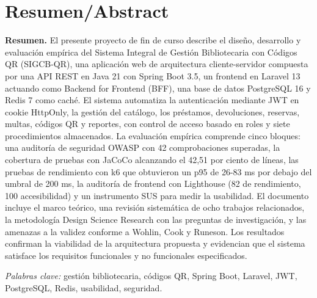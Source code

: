 \documentclass[
11pt,
a4paper,
]{report}
\begin{document}
	\hypertarget{abstract}{%
		\chapter*{Resumen/Abstract}\label{abstract}}
	
	\textbf{Resumen.} El presente proyecto de fin de curso describe el diseño, desarrollo y evaluación empírica del Sistema Integral de Gestión Bibliotecaria con Códigos QR (SIGCB-QR), una aplicación web de arquitectura cliente-servidor compuesta por una API REST en Java 21 con Spring Boot 3.5, un frontend en Laravel 13 actuando como Backend for Frontend (BFF), una base de datos PostgreSQL 16 y Redis 7 como caché. El sistema automatiza la autenticación mediante JWT en cookie HttpOnly, la gestión del catálogo, los préstamos, devoluciones, reservas, multas, códigos QR y reportes, con control de acceso basado en roles y siete procedimientos almacenados. La evaluación empírica comprende cinco bloques: una auditoría de seguridad OWASP con 42 comprobaciones superadas, la cobertura de pruebas con JaCoCo alcanzando el 42,51 por ciento de líneas, las pruebas de rendimiento con k6 que obtuvieron un p95 de 26-83 ms por debajo del umbral de 200 ms, la auditoría de frontend con Lighthouse (82 de rendimiento, 100 accesibilidad) y un instrumento SUS para medir la usabilidad. El documento incluye el marco teórico, una revisión sistemática de ocho trabajos relacionados, la metodología Design Science Research con las preguntas de investigación, y las amenazas a la validez conforme a Wohlin, Cook y Runeson. Los resultados confirman la viabilidad de la arquitectura propuesta y evidencian que el sistema satisface los requisitos funcionales y no funcionales especificados.
	
	\emph{Palabras clave:} gestión bibliotecaria, códigos QR, Spring Boot, Laravel, JWT, PostgreSQL, Redis, usabilidad, seguridad.
	
	\hfill
	
\end{document}
